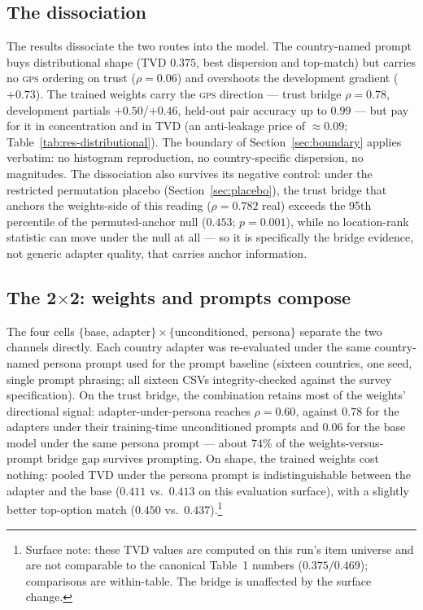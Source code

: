 \documentclass[10pt,letterpaper]{article}
\newcommand{\GPS}{\textsc{gps}}
\begin{document}
\subsection{The dissociation}
The results dissociate the two routes into the model. The country-named prompt buys distributional shape (TVD $0.375$, best dispersion and top-match) but carries no \GPS{} ordering on trust ($\rho=0.06$) and overshoots the development gradient ($+0.73$). The trained weights carry the \GPS{} direction --- trust bridge $\rho=0.78$, development partials $+0.50$/$+0.46$, held-out pair accuracy up to $0.99$ --- but pay for it in concentration and in TVD (an anti-leakage price of $\approx 0.09$; Table~\ref{tab:res-distributional}). The boundary of Section~\ref{sec:boundary} applies verbatim: no histogram reproduction, no country-specific dispersion, no magnitudes. The dissociation also survives its negative control: under the restricted permutation placebo (Section~\ref{sec:placebo}), the trust bridge that anchors the weights-side of this reading ($\rho=0.782$ real) exceeds the 95th percentile of the permuted-anchor null ($0.453$; $p=0.001$), while no location-rank statistic can move under the null at all --- so it is specifically the bridge evidence, not generic adapter quality, that carries anchor information.

\subsection{The 2$\times$2: weights and prompts compose}\label{sec:twobytwo}
The four cells $\{$base, adapter$\}\times\{$unconditioned, persona$\}$ separate the two channels directly. Each country adapter was re-evaluated under the same country-named persona prompt used for the prompt baseline (sixteen countries, one seed, single prompt phrasing; all sixteen CSVs integrity-checked against the survey specification). On the trust bridge, the combination retains most of the weights' directional signal: adapter-under-persona reaches $\rho=0.60$, against $0.78$ for the adapters under their training-time unconditioned prompts and $0.06$ for the base model under the same persona prompt --- about $74\%$ of the weights-versus-prompt bridge gap survives prompting. On shape, the trained weights cost nothing: pooled TVD under the persona prompt is indistinguishable between the adapter and the base ($0.411$ vs.\ $0.413$ on this evaluation surface), with a slightly better top-option match ($0.450$ vs.\ $0.437$).\footnote{Surface note: these TVD values are computed on this run's item universe and are not comparable to the canonical Table~1 numbers ($0.375/0.469$); comparisons are within-table. The bridge is unaffected by the surface change.}
\end{document}
